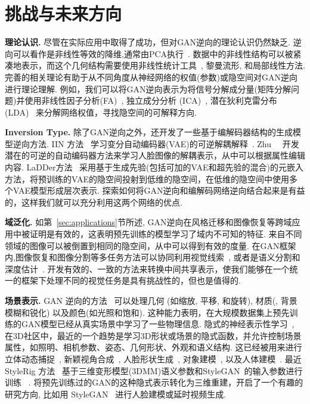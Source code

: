 \section{挑战与未来方向}
\label{sec:outlook}

\noindent\textbf{理论认识.} 
尽管在实际应用中取得了成功，但对GAN逆向的理论认识仍然缺乏.
逆向可以看作是非线性等效的降维,通常由PCA执行~\cite{eric2020GANSpace}. 
数据中的非线性结构可以被紧凑地表示，而这个几何结构需要使用非线性统计工具~\cite{kuhnel2018latent}, 黎曼流形, 和局部线性方法. 
完善的相关理论有助于从不同角度从神经网络的权值(参数)或隐空间对GAN逆向进行理论理解.
例如，我们可以将GAN逆向表示为将信号分解成分量(矩阵分解问题)并使用非线性因子分析(FA)~\cite{harman1976modern}, 独立成分分析 (ICA)~\cite{davies2007source}, 潜在狄利克雷分布 (LDA)~\cite{hoffman2010online,blei2003latent} 来分解网络权值，寻找隐空间的可解释方向. 

\vspace{1mm}
\noindent\textbf{Inversion Type.} 
除了GAN逆向之外，还开发了一些基于编解码器结构的生成模型逆向方法.
IIN 方法~\cite{esser2020invertible} 学习变分自动编码器(VAE)的可逆解耦解释~\cite{kingma2013auto}. 
Zhu~\etal~\cite{zhu2019lia} 开发潜在的可逆的自动编码器方法来学习人脸图像的解耦表示，从中可以根据属性编辑内容. 
LaDDer方法~\cite{Lin2020LaDDer} 采用基于生成先验(包括可加的VAE和超先验的混合)的元嵌入方法，将预训练的VAE的隐空间投射到低维的隐空间，在低维的隐空间中使用多个VAE模型形成层次表示.
探索如何将GAN逆向和编解码网络逆向结合起来是有益的，这样我们就可以充分利用这两个网络的优点.

\vspace{1mm}
\noindent\textbf{域泛化.}
如第~\ref{sec:applications}节所述, GAN逆向在风格迁移和图像恢复等跨域应用中被证明是有效的，这表明预先训练的模型学习了域内不可知的特征. 
来自不同领域的图像可以被倒置到相同的隐空间，从中可以得到有效的度量. 
在GAN框架内,图像恢复和图像分割等多任务方法可以协同利用视觉线索~\cite{xia2019adverse}, 或者是语义分割和深度估计~\cite{Nekrasov2019joint,zhan2019joint}.
开发有效的、一致的方法来转换中间共享表示，使我们能够在一个统一的框架下处理不同的视觉任务是具有挑战性的，但也是值得的. 

\vspace{1mm}
\noindent\textbf{场景表示.}
GAN 逆向的方法~\cite{abdal2020styleflow,voynov2020latent} 可以处理几何 (如缩放, 平移, 和旋转), 材质(\eg, 背景模糊和锐化) 以及颜色(如光照和饱和).
这种能力表明，在大规模数据集上预先训练的GAN模型已经从真实场景中学习了一些物理信息.
隐式的神经表示性学习~\cite{chen2019learning,tucker2020single,rajeswar2020pix2shape}, 在3D社区中，最近的一个趋势是学习3D形状或场景的隐式函数，并允许控制场景属性，如照明、相机参数、姿态、几何形状、外观和语义结构.
这已经被用来进行立体动态捕捉~\cite{chen2020free,liu2020neural,lombardi2019neural}, 新颖视角合成~\cite{martin2020nerf,martin2020nerf}, 人脸形状生成~\cite{wu2020unsupervised}, 对象建模~\cite{nguyen2020blockgan,kato2019self}, 以及人体建模~\cite{zheng2020pamir,bhatnagar2020combining,he2020geo,saito2020pifuhd}.
最近StyleRig 方法~\cite{tewari2020stylerig} 基于三维变形模型(3DMM)语义参数和StyleGAN~\cite{karras2019style}的输入参数进行训练~\cite{egger20203d} .
将预先训练过的GAN的这种隐式表示转化为三维重建，开启了一个有趣的研究方向, 比如用 StyleGAN~\cite{karras2019style} 进行人脸建模或延时视频生成.

